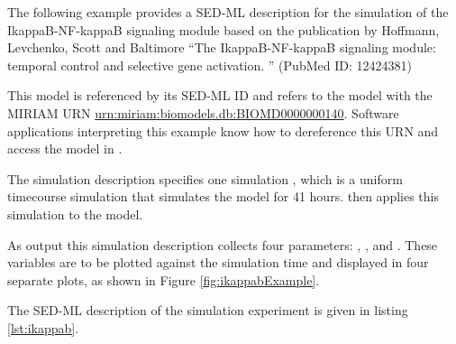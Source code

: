 The following example provides a SED-ML description for the simulation of the IkappaB-NF-kappaB signaling module based on the publication by Hoffmann, Levchenko, Scott and  Baltimore ``The IkappaB-NF-kappaB signaling module: temporal control and selective gene activation. '' (PubMed ID: 12424381)

This model is referenced by its SED-ML ID   and refers to the model with the MIRIAM URN \url{urn:miriam:biomodels.db:BIOMD0000000140}. 
Software applications interpreting this example know how to dereference this URN and access the model in \biom \citep{N+06}.

The simulation description specifies one simulation , which is a uniform timecourse simulation that simulates the model for 41 hours.  then applies this simulation to the model. 

As output this simulation description collects four parameters: , ,  and . These variables are to be plotted against the simulation time and displayed in four separate plots, as shown in Figure \ref{fig:ikappabExample}. 
%
%

The SED-ML description of the simulation experiment is given in listing \ref{lst:ikappab}.


